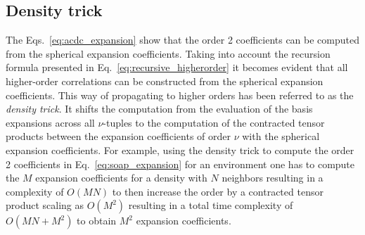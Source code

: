 \subsection{Density trick}
The Eqs.~\eqref{eq:acdc_expansion} show that the order 2 coefficients can be computed from the spherical expansion coefficients.
Taking into account the recursion formula presented in Eq.~\eqref{eq:recursive_higherorder} it becomes evident that all higher-order correlations can be constructed from the spherical expansion coefficients.
This way of propagating to higher orders %
has been referred to as the \emph{density trick}.
It shifts the computation from the evaluation of the basis expansions across all $\nu$-tuples to the computation of the contracted tensor products between the expansion coefficients of order $\nu$ with the spherical expansion coefficients. %
%
For example, using the density trick to compute the order 2 coefficients in Eq.~\eqref{eq:soap_expansion} for an environment one has to compute the $M$ expansion coefficients for a density with $N$ neighbors resulting in a complexity of $O(MN)$ to then increase the order by a contracted tensor product scaling as $O(M^2)$ resulting in a total time complexity of $O(MN+M^2)$ to obtain $M^2$ expansion coefficients.

